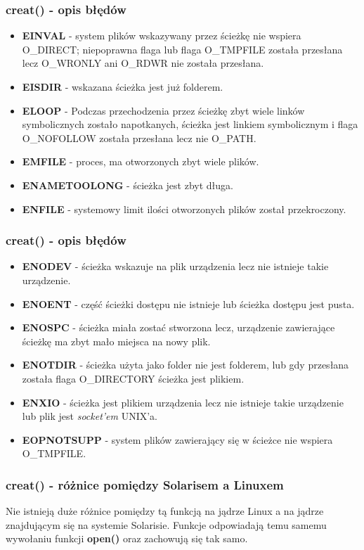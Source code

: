 \documentclass{beamer}
\begin{document}
\begin{frame}
	\frametitle{creat() - opis błędów}
	\begin{itemize}
\item \textbf{EINVAL} - system plików wskazywany przez ścieżkę nie wspiera O\_DIRECT;
	niepoprawna flaga lub flaga O\_TMPFILE została przesłana lecz O\_WRONLY ani
	O\_RDWR nie została przesłana.
\item \textbf{EISDIR} - wskazana ścieżka jest już folderem.
\item \textbf{ELOOP} - Podczas przechodzenia przez ścieżkę zbyt wiele linków symbolicznych zostało napotkanych, ścieżka jest linkiem symbolicznym i flaga O\_NOFOLLOW została przesłana
	lecz nie O\_PATH.
\item \textbf{EMFILE} - proces, ma otworzonych zbyt wiele plików.
\item \textbf{ENAMETOOLONG} - ścieżka jest zbyt długa.
\item \textbf{ENFILE} - systemowy limit ilości otworzonych plików został przekroczony.
\end{itemize}
\end{frame}

\begin{frame}
	\frametitle{creat() - opis błędów}
	\begin{itemize}
\item \textbf{ENODEV} - ścieżka wskazuje na plik urządzenia lecz nie istnieje takie urządzenie.
\item \textbf{ENOENT} - część ścieżki dostępu nie istnieje lub ścieżka dostępu jest pusta.
\item \textbf{ENOSPC} - ścieżka miała zostać stworzona lecz, urządzenie zawierające ścieżkę ma zbyt mało miejsca na nowy plik.
\item \textbf{ENOTDIR} - ścieżka użyta jako folder nie jest folderem, lub gdy przesłana została flaga O\_DIRECTORY ścieżka jest plikiem.
\item \textbf{ENXIO} - ścieżka jest plikiem urządzenia lecz nie istnieje takie urządzenie lub plik jest \textit{socket'em} UNIX'a.
\item \textbf{EOPNOTSUPP} - system plików zawierający się w ścieżce nie wspiera O\_TMPFILE.
\end{itemize}
\end{frame}

\begin{frame}
	\frametitle{creat() - różnice pomiędzy Solarisem a Linuxem}
Nie istnieją duże różnice pomiędzy tą funkcją na jądrze Linux a na jądrze znajdującym się na systemie Solarisie.
Funkcje odpowiadają temu samemu wywołaniu funkcji \textbf{open()} oraz zachowują się tak samo.
\end{frame}
\end{document}
